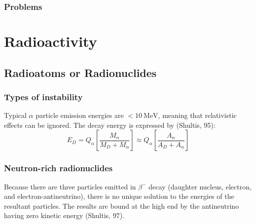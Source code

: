 \documentclass{article}
\begin{document}
\subsubsection{Problems}

\newpage

\section{Radioactivity}

\subsection{Radioatoms or Radionuclides}

\subsubsection{Types of instability}
Typical $\alpha$ particle emission energies are $<\SI{10}{\mega\electronvolt}$, meaning that relativistic effects can be ignored. The decay energy is expressed by (Shultis, 95): $$ E_D = Q_\alpha \left[ \frac{M_\alpha}{M_D + M_\alpha} \right] \approx Q_\alpha \left[\frac{A_\alpha}{A_D + A_\alpha} \right] $$

\subsubsection{Neutron-rich radionuclides}
Because there are three particles emitted in $ \beta^- $ decay (daughter nucleus, electron, and electron-antineutrino), there is no unique solution to the energies of the resultant particles. The results are bound at the high end by the antineutrino having zero kinetic energy (Shultis, 97).

\newpage
\end{document}
